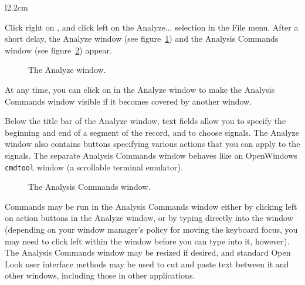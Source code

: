 \documentclass[twoside]{book}
\newcommand{\button}[1]{\cornersize{2}\ovalbox{\rule[-.3mm]{0cm}{2.5mm}\small\sf ~#1~}}
\newcommand{\menubutton}[1]{\button{#1~\ensuremath{\nabla}}}
\begin{document}
\begin{wrapfigure}[9]{l}{2.2cm}
\mbox{}
\end{wrapfigure}
Click right on \menubutton{File}, and click left on the {\sf Analyze...}
selection in the File menu.  After a short delay, the {\sf Analyze}
window (see figure~\ref{fig:analyze-window}) and the
{\sf Analysis Commands} window (see figure~\ref{fig:analysis-commands}) appear.
\begin{figure}
\centerline{}
\caption{The {\sf Analyze} window.}
\begin{htmlonly}
\end{htmlonly}
\begin{latexonly}
\end{latexonly}
\label{fig:analyze-window}
\end{figure}
At any time, you can click on \button{Show command window} in the {\sf Analyze}
window to make the {\sf Analysis Commands} window visible if it becomes
covered by another window.

Below the title bar of the {\sf Analyze} window, text fields allow you to
specify the beginning and end of a segment of the record, and to
choose signals.  The {\sf Analyze} window also contains buttons specifying
various actions that you can apply to the signals.  The separate
{\sf Analysis Commands} window behaves like an OpenWindows {\tt cmdtool}
window (a scrollable terminal emulator).  
\begin{figure}
\centerline{}
\caption{The {\sf Analysis Commands} window.}
\begin{htmlonly}
\end{htmlonly}
\begin{latexonly}
\end{latexonly}
\label{fig:analysis-commands}
\end{figure}
Commands may be run in the
{\sf Analysis Commands} window either by clicking left on action buttons
in the {\sf Analyze} window, or by typing directly into the window (depending
on your window manager's policy for moving the keyboard focus, you may
need to click left within the window before you can type into it,
however).  The {\sf Analysis Commands} window may be resized if desired, and
standard Open Look user interface methods may be used to cut and paste
text between it and other windows, including those in other
applications.
\end{document}
